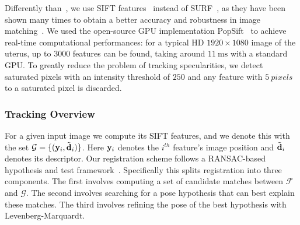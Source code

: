 Differently than~\cite{Collins2013}, we use SIFT features~\cite{Lowe:2004:DIF:993451.996342} instead of SURF~\cite{SURF}, as they have been shown many times to obtain a better accuracy and robustness in image matching~\cite{Tuytelaars2007}. We used the open-source GPU implementation PopSift~\cite{Griwodz2018Popsift} to achieve real-time computational performances: for a typical HD $1920\times1080$ image of the uterus, up to $3000$ features can be found, taking around $\SI{11}{\milli\second}$ with a standard GPU.
To greatly reduce the problem of tracking specularities, we detect saturated pixels with an intensity threshold of $250$ and any feature with $\SI{5}{pixels}$ to a saturated pixel is discarded.

\subsubsection{Tracking Overview}
\label{sec:registration}
For a given input image we compute its SIFT features, and %
we denote this with the set $\mathcal{G}=\{(\mathbf{y}_{i},\tilde{\mathbf{d}}_{i})\}$. Here $\mathbf{y}_{i}$ denotes the $i^{th}$ feature's image position and $\tilde{\mathbf{d}}_{i}$ denotes its descriptor. Our registration scheme follows a RANSAC-based hypothesis and test framework~\cite{Fischler:1981:RSC:358669.358692}. Specifically this splits registration into three components. The first involves computing a set of candidate matches between $\mathcal{F}$ and $\mathcal{G}$. The second involves searching for a pose hypothesis that can best explain these matches. The third involves refining the pose of the best hypothesis with Levenberg-Marquardt.

